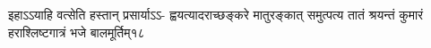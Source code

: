 
\fourlineindentedshlokanum
{इहाऽऽयाहि वत्सेति हस्तान् प्रसार्याऽऽ-}
{ह्वयत्यादराच्छङ्करे मातुरङ्कात्}
{समुत्पत्य तातं श्रयन्तं कुमारं}
{हराश्लिष्टगात्रं भजे बालमूर्तिम्}{१८}

